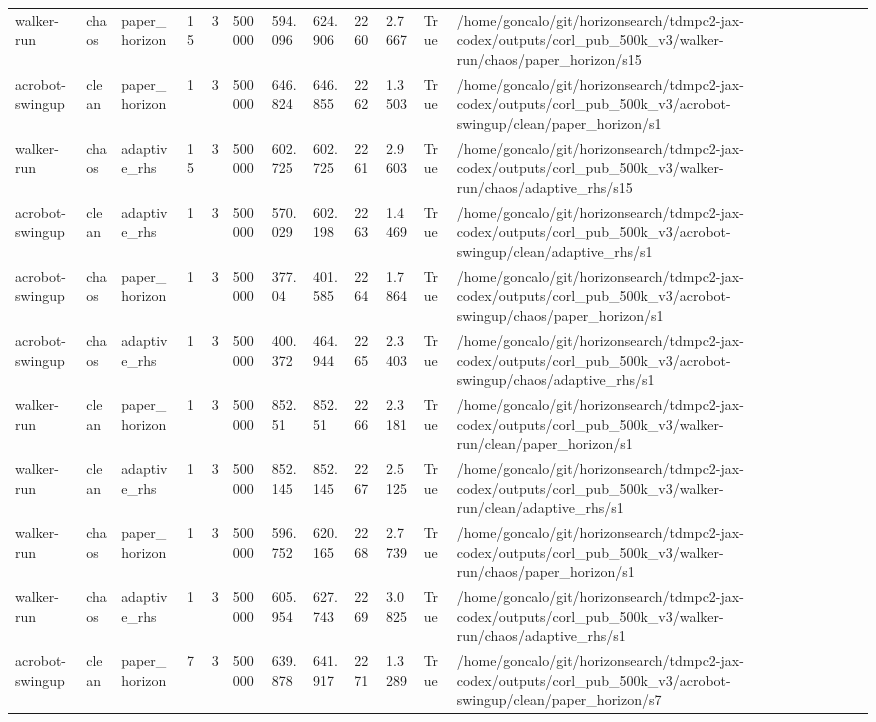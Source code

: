 \begin{tabular}{llllllllllll}
walker-run & chaos & paper\_horizon & 15 & 3 & 500000 & 594.096 & 624.906 & 2260 & 2.7667 & True & /home/goncalo/git/horizonsearch/tdmpc2-jax-codex/outputs/corl\_pub\_500k\_v3/walker-run/chaos/paper\_horizon/s15 \\
acrobot-swingup & clean & paper\_horizon & 1 & 3 & 500000 & 646.824 & 646.855 & 2262 & 1.3503 & True & /home/goncalo/git/horizonsearch/tdmpc2-jax-codex/outputs/corl\_pub\_500k\_v3/acrobot-swingup/clean/paper\_horizon/s1 \\
walker-run & chaos & adaptive\_rhs & 15 & 3 & 500000 & 602.725 & 602.725 & 2261 & 2.9603 & True & /home/goncalo/git/horizonsearch/tdmpc2-jax-codex/outputs/corl\_pub\_500k\_v3/walker-run/chaos/adaptive\_rhs/s15 \\
acrobot-swingup & clean & adaptive\_rhs & 1 & 3 & 500000 & 570.029 & 602.198 & 2263 & 1.4469 & True & /home/goncalo/git/horizonsearch/tdmpc2-jax-codex/outputs/corl\_pub\_500k\_v3/acrobot-swingup/clean/adaptive\_rhs/s1 \\
acrobot-swingup & chaos & paper\_horizon & 1 & 3 & 500000 & 377.04 & 401.585 & 2264 & 1.7864 & True & /home/goncalo/git/horizonsearch/tdmpc2-jax-codex/outputs/corl\_pub\_500k\_v3/acrobot-swingup/chaos/paper\_horizon/s1 \\
acrobot-swingup & chaos & adaptive\_rhs & 1 & 3 & 500000 & 400.372 & 464.944 & 2265 & 2.3403 & True & /home/goncalo/git/horizonsearch/tdmpc2-jax-codex/outputs/corl\_pub\_500k\_v3/acrobot-swingup/chaos/adaptive\_rhs/s1 \\
walker-run & clean & paper\_horizon & 1 & 3 & 500000 & 852.51 & 852.51 & 2266 & 2.3181 & True & /home/goncalo/git/horizonsearch/tdmpc2-jax-codex/outputs/corl\_pub\_500k\_v3/walker-run/clean/paper\_horizon/s1 \\
walker-run & clean & adaptive\_rhs & 1 & 3 & 500000 & 852.145 & 852.145 & 2267 & 2.5125 & True & /home/goncalo/git/horizonsearch/tdmpc2-jax-codex/outputs/corl\_pub\_500k\_v3/walker-run/clean/adaptive\_rhs/s1 \\
walker-run & chaos & paper\_horizon & 1 & 3 & 500000 & 596.752 & 620.165 & 2268 & 2.7739 & True & /home/goncalo/git/horizonsearch/tdmpc2-jax-codex/outputs/corl\_pub\_500k\_v3/walker-run/chaos/paper\_horizon/s1 \\
walker-run & chaos & adaptive\_rhs & 1 & 3 & 500000 & 605.954 & 627.743 & 2269 & 3.0825 & True & /home/goncalo/git/horizonsearch/tdmpc2-jax-codex/outputs/corl\_pub\_500k\_v3/walker-run/chaos/adaptive\_rhs/s1 \\
acrobot-swingup & clean & paper\_horizon & 7 & 3 & 500000 & 639.878 & 641.917 & 2271 & 1.3289 & True & /home/goncalo/git/horizonsearch/tdmpc2-jax-codex/outputs/corl\_pub\_500k\_v3/acrobot-swingup/clean/paper\_horizon/s7 \\

\end{tabular}
